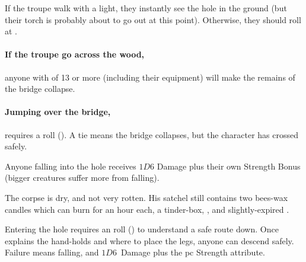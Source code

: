 \begin{multicols}{2}
If the troupe walk with a light, they instantly see the hole in the ground (but their torch is probably about to go out at this point).
Otherwise, they should roll  at \tn[8].

\paragraph{If the troupe go across the wood,}
anyone with  of 13 or more (including their \gls{equipment}) will make the remains of the bridge collapse.

\paragraph{Jumping over the bridge,}
requires a  roll (\tn[9]).
A tie means the bridge collapses, but the character has crossed safely.

Anyone falling into the hole receives $1D6$ Damage plus their own Strength Bonus (bigger creatures suffer more from falling).

The corpse is dry, and not very rotten.
His satchel still contains two bees-wax candles which can burn for an hour each, a tinder-box, \lootMedium, and slightly-expired \rations.
\label{caveCoinsI}
\setcounter{diceNo}{0}%
\renewcommand\npcsymbol{\currency}%



Entering the hole requires an  roll (\tn[7]) to understand a safe route down.
Once  explains the hand-holds and where to place the legs, anyone can descend safely.
Failure means falling, and $1D6$~Damage plus the \gls{pc} Strength \gls{attribute}.




\end{multicols}
